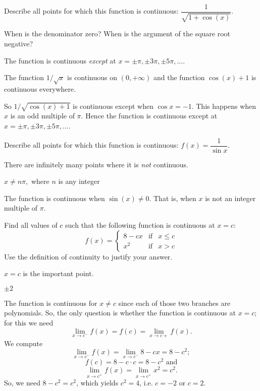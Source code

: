 \begin{question}[2015Q]
Describe all points for which this function is continuous:
$\dfrac{1}{\sqrt{1+\cos(x)}}$.
\end{question}
\begin{hint} When is the denominator zero? When is the argument of the square root negative?
\end{hint}
\begin{answer}
The function is continuous \emph{except} at
$x=\pm \pi, \pm 3\pi, \pm 5\pi, \dots$.
\end{answer}
\begin{solution}
The function $1/\sqrt{x}$ is continuous on $(0,+\infty)$ and the function  $\cos(x) +
1$ is  continuous everywhere.

So $1/\sqrt{\cos(x) + 1 }$ is continuous except when $\cos x=-1$. This
happens when $x$ is an odd multiple of $\pi$. Hence the function is continuous except at
$x=\pm \pi, \pm 3\pi, \pm 5\pi, \dots$.
\end{solution}


\begin{question}[2015Q]
Describe all points for which this function is continuous: $f(x)=\dfrac{1}{\sin x}$.
\end{question}
\begin{hint}
There are infinitely many points where it is \emph{not} continuous.
\end{hint}
\begin{answer} $x \neq n\pi,$ where $n$ is any integer
\end{answer}
\begin{solution}
The function is continuous when $\sin(x)\neq 0$. That is, when $x$ is not an integer
multiple of $\pi$.
\end{solution}



\begin{question}[2015Q]
Find all values of $c$ such that the following function is continuous at $x=c$:
\[f(x)=\left\{\begin{array}{ccc}
8-cx & \text{if} & x\le c\\
x^2 &  \text{if} & x> c
\end{array}\right.\]
Use the definition of continuity to justify your answer.
\end{question}
\begin{hint} $x=c$ is the important point.
\end{hint}
\begin{answer} $\pm 2$
\end{answer}
\begin{solution}
The function is continuous for $x\ne c$ since each of those two branches are polynomials. So, the only question is whether the function is continuous at $x=c$; for this we need
$$\lim_{x\to c^-}f(x)=f(c)=\lim_{x\to c+}f(x).$$
We compute
$$\lim_{x\to c^-}f(x)=\lim_{x\to c^-}8-cx = 8-c^2;$$
$$f(c)=8-c\cdot c= 8-c^2\text{ and}$$
$$\lim_{x\to c^+}f(x)=\lim_{x\to c^+}x^2=c^2.$$
So, we need $8-c^2=c^2$, which yields $c^2=4$, i.e. $c=-2$ or $c=2$.
\end{solution}



